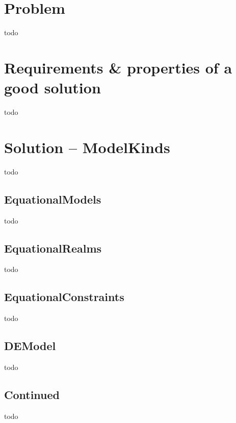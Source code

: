 
\section{Problem}
todo

\section{Requirements \& properties of a good solution}
todo

\section{Solution -- ModelKinds}
todo

\subsection{EquationalModels}
todo

\subsection{EquationalRealms}
todo

\subsection{EquationalConstraints}
todo

\subsection{DEModel}
todo

\subsection{Continued}
todo
